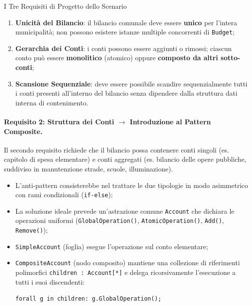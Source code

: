 \documentclass[12pt]{extarticle}
\begin{document}
\begin{cbox}{I Tre Requisiti di Progetto dello Scenario}
\begin{enumerate}
    \item \textbf{Unicità del Bilancio}: il bilancio comunale deve essere \textbf{unico} per l'intera municipalità; non possono esistere istanze multiple concorrenti di \texttt{Budget};
    \item \textbf{Gerarchia dei Conti}: i conti possono essere aggiunti o rimossi; ciascun conto può essere \textbf{monolitico} (atomico) oppure \textbf{composto da altri sotto-conti};
    \item \textbf{Scansione Sequenziale}: deve essere possibile scandire sequenzialmente tutti i conti presenti all'interno del bilancio senza dipendere dalla struttura dati interna di contenimento.
\end{enumerate}
\end{cbox}

\paragraph{Requisito 2: Struttura dei Conti $\to$ Introduzione al Pattern Composite.}
Il secondo requisito richiede che il bilancio possa contenere conti singoli (es. capitolo di spesa elementare) e conti aggregati (es. bilancio delle opere pubbliche, suddiviso in manutenzione strade, scuole, illuminazione).
\begin{itemize}
    \item L'anti-pattern consisterebbe nel trattare le due tipologie in modo asimmetrico con rami condizionali (\texttt{if-else});
    \item La soluzione ideale prevede un'astrazione comune \texttt{Account} che dichiara le operazioni uniformi (\texttt{GlobalOperation()}, \texttt{AtomicOperation()}, \texttt{Add()}, \texttt{Remove()});
    \item \texttt{SimpleAccount} (foglia) esegue l'operazione sul conto elementare;
    \item \texttt{CompositeAccount} (nodo composito) mantiene una collezione di riferimenti polimorfici \texttt{children : Account[*]} e delega ricorsivamente l'esecuzione a tutti i suoi discendenti:
    \begin{center}
        \texttt{forall g in children: g.GlobalOperation();}
    \end{center}
\end{itemize}
\end{document}
